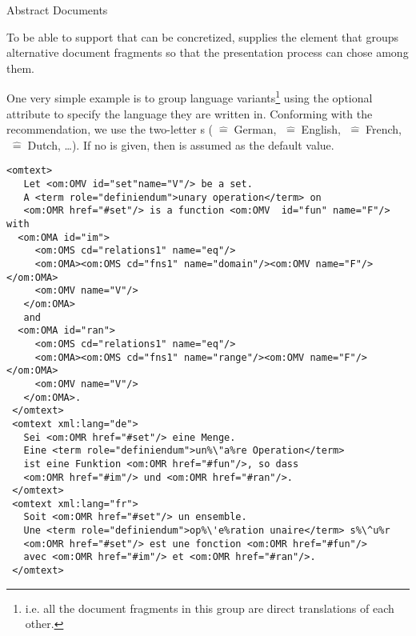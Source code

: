\begin{omgroup}[id=omdoc-infrastructure,short=Document Infrastructure]
\begin{module}[id=docalt]
\begin{omgroup}{Abstract Documents}
\begin{definition}[id=docalt.def]
  To be able to support {} that can be concretized, {\omdoc}
  supplies the {} element that groups alternative document fragments so that the
  presentation process can chose among them.
 \end{definition}

\begin{example}
  One very simple example is to group language variants\footnote{i.e. all the document
    fragments in this group are direct translations of each other.} using the optional
  {} attribute to specify the language they are written
  in. Conforming with the {\xml} recommendation, we use the  two-letter {s}
  ({}$\;\widehat=\;$German, {}$\;\widehat=\;$English,
  {}$\;\widehat=\;$French, {}$\;\widehat=\;$Dutch, \ldots). If
  no {} is given, then {} is
  assumed as the default value. 

\begin{lstlisting}[escapechar=\%,label=lst:multiling,mathescape,
  caption={A Multilingual Group of {\element{CMP}} Elements},
  index={trl,xml:lang}]
 <omtext>
   Let <om:OMV id="set"name="V"/> be a set. 
   A <term role="definiendum">unary operation</term> on 
   <om:OMR href="#set"/> is a function <om:OMV  id="fun" name="F"/> with
  <om:OMA id="im">
     <om:OMS cd="relations1" name="eq"/>
     <om:OMA><om:OMS cd="fns1" name="domain"/><om:OMV name="F"/></om:OMA>
     <om:OMV name="V"/>
   </om:OMA>
   and 
  <om:OMA id="ran">
     <om:OMS cd="relations1" name="eq"/>
     <om:OMA><om:OMS cd="fns1" name="range"/><om:OMV name="F"/></om:OMA>
     <om:OMV name="V"/>
   </om:OMA>.
 </omtext>
 <omtext xml:lang="de">
   Sei <om:OMR href="#set"/> eine Menge. 
   Eine <term role="definiendum">un%\"a%re Operation</term> 
   ist eine Funktion <om:OMR href="#fun"/>, so dass
   <om:OMR href="#im"/> und <om:OMR href="#ran"/>.
 </omtext>
 <omtext xml:lang="fr">
   Soit <om:OMR href="#set"/> un ensemble. 
   Une <term role="definiendum">op%\'e%ration unaire</term> s%\^u%r
   <om:OMR href="#set"/> est une fonction <om:OMR href="#fun"/> 
   avec <om:OMR href="#im"/> et <om:OMR href="#ran"/>.
 </omtext>
\end{lstlisting}


\end{example}
\end{omgroup}
\end{module}
\end{omgroup}
